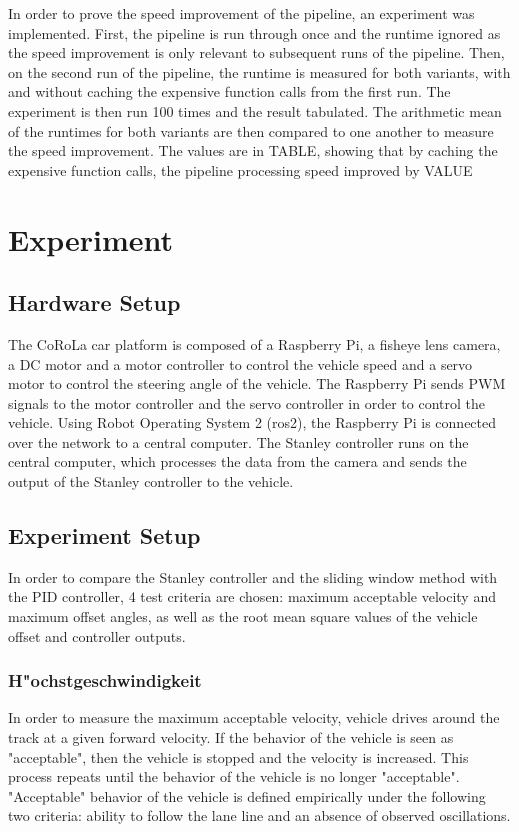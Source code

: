 \documentclass[arbeit=studie,oneside,BCOR=12mm]{ArbeitRST}
\begin{document}
In order to prove the speed improvement of the pipeline, an experiment was 
implemented. First, the pipeline is run through once and the runtime ignored as
the speed improvement is only relevant to subsequent runs of the pipeline. Then,
on the second run of the pipeline, the runtime is measured for both variants, 
with and without caching the expensive function calls from the first run. The 
experiment is then run 100 times and the result tabulated. The arithmetic mean 
of the runtimes for both variants are then compared to one another to measure 
the speed improvement. The values are in TABLE, showing that by caching the 
expensive function calls, the pipeline processing speed improved by VALUE%

\chapter{Experiment}
\section{Hardware Setup}
The CoRoLa car platform is composed of a Raspberry Pi, a fisheye lens camera, a
DC motor and a motor controller to control the vehicle speed and a servo motor
to control the steering angle of the vehicle. The Raspberry Pi sends PWM
signals to the motor controller and the servo controller in order to control
the vehicle. Using Robot Operating System 2 (ros2), the Raspberry Pi is
connected over the network to a central computer. The Stanley controller runs
on the central computer, which processes the data from the camera and sends the
output of the Stanley controller to the vehicle.

\section{Experiment Setup}
In order to compare the Stanley controller and the sliding window method with
the PID controller, 4 test criteria are chosen: maximum acceptable velocity and
maximum offset angles, as well as the root mean square values of the vehicle
offset and controller outputs.

\subsection{H"ochstgeschwindigkeit}
In order to measure the maximum acceptable velocity, vehicle drives around the
track at a given forward velocity. If the behavior of the vehicle is seen as
"acceptable", then the vehicle is stopped and the velocity is increased. This
process repeats until the behavior of the vehicle is no longer "acceptable".
"Acceptable" behavior of the vehicle is defined empirically under the following
two criteria: ability to follow the lane line and an absence of observed
oscillations.
\end{document}
